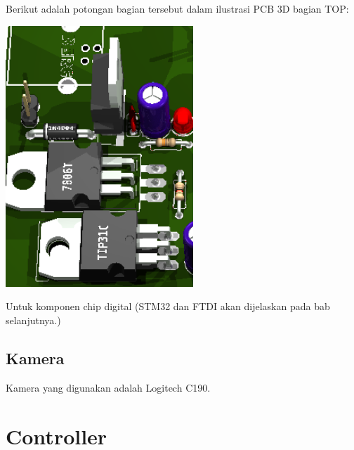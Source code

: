 \documentclass[11pt,fleqn]{book} %
\begin{document}
\begin{flushleft}
\begin{center}
\end{center}
Berikut adalah potongan bagian tersebut dalam ilustrasi PCB 3D bagian TOP:
\begin{center}
 \includegraphics[width=200pt]{./screenshot/pcb/eagle8}\\
\end{center}
\vspace{5pt}
\hspace{10pt} Untuk komponen chip digital (STM32 dan FTDI akan dijelaskan pada bab selanjutnya.)
\end{flushleft}

\section{Kamera}
\begin{flushleft}
 \hspace{10pt} Kamera yang digunakan adalah Logitech C190.
\end{flushleft}

\newpage
{} %
\chapter{Controller}
\end{document}
